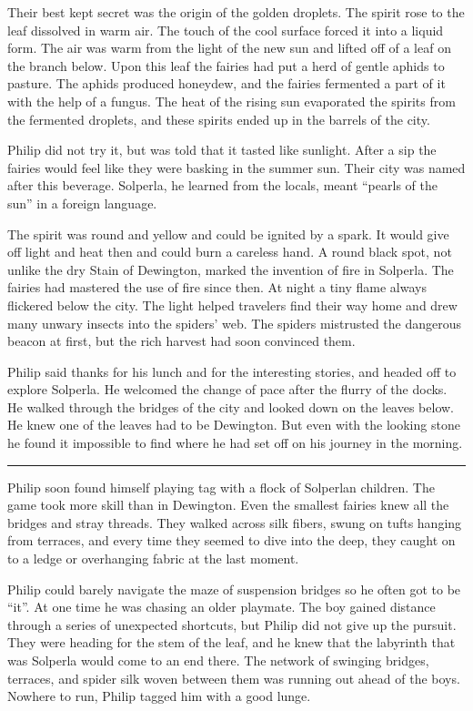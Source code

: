 \documentclass[10pt]{memoir}
\renewcommand{\pfbreakdisplay}{\bigskip \ding{166} \bigskip}
\newcommand{\secbreak}{\fancybreak{\pfbreakdisplay}}
\begin{document}
Their best kept secret was the origin of the golden droplets. The spirit rose
to the leaf dissolved in warm air. The touch of the cool surface forced it into
a liquid form. The air was warm from the light of the new sun and lifted off of
a leaf on the branch below. Upon this leaf the fairies had put a herd of gentle
aphids to pasture. The aphids produced honeydew, and the fairies fermented a
part of it with the help of a fungus. The heat of the rising sun evaporated the
spirits from the fermented droplets, and these spirits ended up in the barrels
of the city.

Philip did not try it, but was told that it tasted like sunlight. After a sip
the fairies would feel like they were basking in the summer sun. Their city was
named after this beverage. Solperla, he learned from the locals, meant ``pearls
of the sun'' in a foreign language.

The spirit was round and yellow and could be ignited by a spark. It would give
off light and heat then and could burn a careless hand. A round black spot,
not unlike the dry Stain of Dewington, marked the invention of fire in
Solperla. The fairies had mastered the use of fire since then. At night a tiny
flame always flickered below the city. The light helped travelers find their
way home and drew many unwary insects into the spiders' web. The spiders
mistrusted the dangerous beacon at first, but the rich harvest had soon
convinced them.

Philip said thanks for his lunch and for the interesting stories, and headed
off to explore Solperla. He welcomed the change of pace after the flurry of the
docks. He walked through the bridges of the city and looked down on the leaves
below. He knew one of the leaves had to be Dewington. But even with the looking
stone he found it impossible to find where he had set off on his journey in the
morning.

\secbreak

Philip soon found himself playing tag with a flock of Solperlan children. The
game took more skill than in Dewington. Even the smallest fairies knew all the
bridges and stray threads. They walked across silk fibers, swung on tufts
hanging from terraces, and every time they seemed to dive into the deep, they
caught on to a ledge or overhanging fabric at the last moment.

Philip could barely navigate the maze of suspension bridges so he often got to
be ``it''. At one time he was chasing an older playmate. The boy gained
distance through a series of unexpected shortcuts, but Philip did not give up
the pursuit. They were heading for the stem of the leaf, and he knew that the
labyrinth that was Solperla would come to an end there. The network of swinging
bridges, terraces, and spider silk woven between them was running out ahead of
the boys. Nowhere to run, Philip tagged him with a good lunge.
\end{document}
